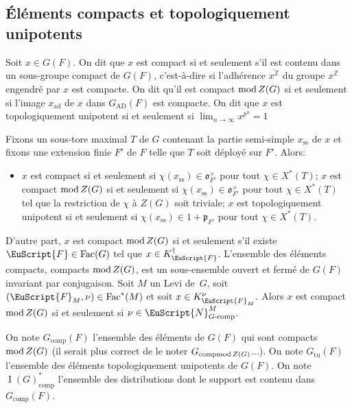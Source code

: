 \documentclass[JEP,XML,SOM,Unicode,francais]{cedram}
\let\mathcal \EuScript
\newcommand{\rmod}{\textup{mod}\,}
\newcommand{\fro}{\mathfrak{o}}
\newcommand{\frp}{\mathfrak{p}}
\newcommand{\AD}{\mathrm{AD}}
\newcommand{\comp}{\mathrm{comp}}
\newcommand{\tcomp}{\textup{-comp}}
\newcommand{\Fac}{\mathrm{Fac}}
\newcommand{\rss}{\mathrm{ss}}
\newcommand{\tu}{\mathrm{tu}}
\DeclareMathOperator{\ad}{ad}
\DeclareMathOperator{\rI}{I}
\newcommand{\cF}{\mathcal{F}}
\newcommand{\cN}{\mathcal{N}}
\newcommand{\ZZ}{\mathbb{Z}}
\theoremstyle{plain}
\theoremstyle{definition}
\begin{document}
\subsection{Éléments compacts et topologiquement unipotents}\label{elementscompacts}
Soit $x\in G(F)$. On dit que $x$ est compact si et seulement s'il est contenu dans un sous-groupe compact de $G(F)$, c'est-à-dire si l'adhérence $\overline{x^{\ZZ}}$ du groupe $x^{\ZZ}$ engendré par $x$ est compacte. On dit qu'il est compact $\rmod Z(G)$ si et seulement si l'image $x_{\ad}$ de $x$ dans $G_{\AD}(F)$ est compacte. On dit que $x$ est topologiquement unipotent si et seulement si $\lim_{n\to \infty}x^{p^n}=1$

Fixons un sous-tore maximal $T$ de $G$ contenant la partie semi-simple $x_{\rss}$ de $x$ et fixons une extension finie $F'$ de $F$ telle que $T$ soit déployé sur $F'$. Alors:
\begin{itemize}
\item
$x$ est compact si et seulement si $ \chi(x_{\rss})\in \fro^{\times}_{F'}$ pour tout $\chi\in X^*(T)$; $x$ est compact $\rmod Z(G)$ si et seulement si $ \chi(x_{\rss})\in \fro^{\times}_{F'}$ pour tout $\chi\in X^*(T)$ tel que la restriction de $\chi$ à $Z(G)$ soit triviale; $x$ est topologiquement unipotent si et seulement si $\chi(x_{\rss})\in 1+\frp_{F'}$ pour tout $\chi\in X^*(T)$.
\end{itemize}

D'autre part, $x$ est compact $\rmod Z(G)$ si et seulement s'il existe $\cF\in \Fac(G)$ tel que $x\in K_{\cF}^{\dag}$. L'ensemble des éléments compacts, \resp compacts $\rmod Z(G)$, est un sous-ensemble ouvert et fermé de $G(F)$ invariant par conjugaison. Soit $M$ un Levi de~$G$, soit $(\cF_{M},\nu)\in \Fac^*(M)$ et soit $x\in K_{\cF_{M}}^{\nu}$. Alors $x$ est compact $\rmod Z(G)$ si et seulement si $\nu\in \cN^M_{G\tcomp}$.

On note $G_{\comp}(F)$ l'ensemble des éléments de $G(F)$ qui sont compacts $\rmod Z(G)$ (il serait plus correct de le noter $G_{\comp\rmod Z(G)}$...). On note $G_{\tu}(F)$ l'ensemble des éléments topologiquement unipotents de $G(F)$. On note $\rI(G)^*_{\comp}$ l'ensemble des distributions dont le support est contenu dans $G_{\comp}(F)$.
\end{document}
